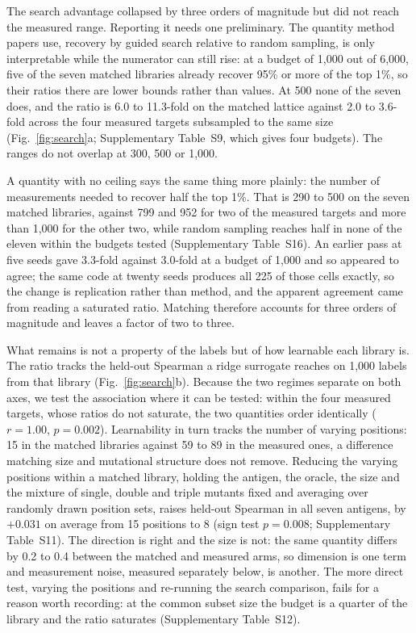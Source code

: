 \documentclass[pdflatex,sn-nature]{sn-jnl}
\theoremstyle{thmstyleone}
\theoremstyle{thmstyletwo}
\theoremstyle{thmstylethree}
\begin{document}
The search advantage collapsed by three orders of magnitude but did not reach
the measured range. Reporting it needs one preliminary. The quantity method
papers use, recovery by guided search relative to random sampling, is only
interpretable while the numerator can still rise: at a budget of 1{,}000 out of
6{,}000, five of the seven matched libraries already recover 95\% or more of
the top 1\%, so their ratios there are lower bounds rather than values. At 500
none of the seven does, and the ratio is 6.0 to 11.3-fold on the matched
lattice against 2.0 to 3.6-fold across the four measured targets subsampled to
the same size (Fig.~\ref{fig:search}a; Supplementary Table~S9, which gives four
budgets). The ranges do not overlap at 300, 500 or 1{,}000.

A quantity with no ceiling says the same thing more plainly: the number of
measurements needed to recover half the top 1\%. That is 290 to 500 on the
seven matched libraries, against 799 and 952 for two of the measured targets
and more than 1{,}000 for the other two, while random sampling reaches half in
none of the eleven within the budgets tested (Supplementary Table~S16). An
earlier pass at five seeds gave 3.3-fold against 3.0-fold at a budget of
1{,}000 and so appeared to agree; the same code at twenty seeds produces all
225 of those cells exactly, so the change is replication rather than method,
and the apparent agreement came from reading a saturated ratio. Matching
therefore accounts for three orders of magnitude and leaves a factor of two to
three.

What remains is not a property of the labels but of how learnable each library
is. The ratio tracks the held-out Spearman a ridge surrogate reaches on 1{,}000
labels from that library (Fig.~\ref{fig:search}b). Because the two regimes
separate on both axes, we test the association where it can be tested: within
the four measured targets, whose ratios do not saturate, the two quantities
order identically ($r = 1.00$, $p = 0.002$). Learnability in turn tracks the
number of varying positions: 15 in
the matched libraries against 59 to 89 in the measured ones, a difference
matching size and mutational structure does not remove. Reducing the varying
positions within a matched library, holding the antigen, the oracle, the size
and the mixture of single, double and triple mutants fixed and averaging over
randomly drawn position sets, raises held-out Spearman in all seven antigens,
by $+0.031$ on average from 15 positions to 8 (sign test $p = 0.008$;
Supplementary Table~S11). The direction is
right and the size is not: the same quantity differs by 0.2 to 0.4 between the
matched and measured arms, so dimension is one term and measurement noise,
measured separately below, is another. The more direct test, varying the
positions and re-running the search comparison, fails for a reason worth
recording: at the common subset size the budget is a quarter of the library and
the ratio saturates (Supplementary Table~S12).
\end{document}
